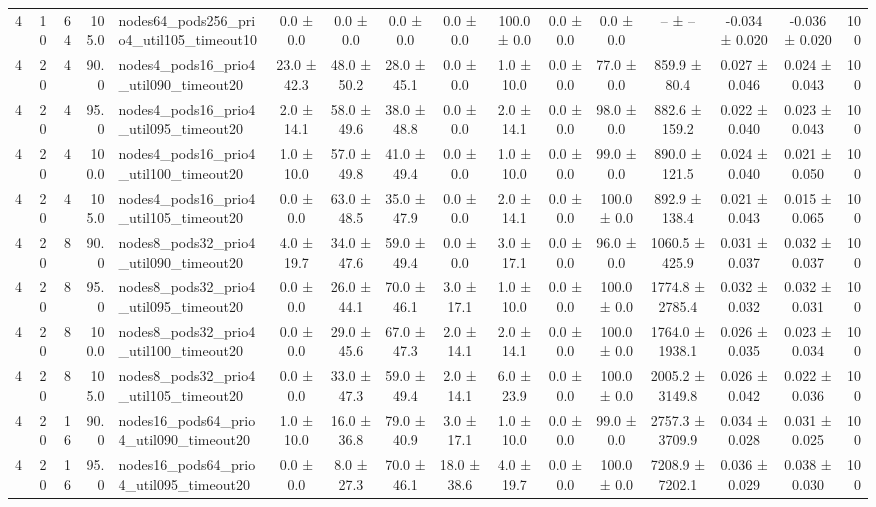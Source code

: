 \begin{tabular}{r r r r l c c c c c c c c c c r}
4 & 10 & 64 & 105.0 & nodes64\_pods256\_prio4\_util105\_timeout10 & 0.0 ± 0.0 & 0.0 ± 0.0 & 0.0 ± 0.0 & 0.0 ± 0.0 & 100.0 ± 0.0 & 0.0 ± 0.0 & 0.0 ± 0.0 & -- ± -- & -0.034 ± 0.020 & -0.036 ± 0.020 & 100 \\
4 & 20 & 4 & 90.0 & nodes4\_pods16\_prio4\_util090\_timeout20 & 23.0 ± 42.3 & 48.0 ± 50.2 & 28.0 ± 45.1 & 0.0 ± 0.0 & 1.0 ± 10.0 & 0.0 ± 0.0 & 77.0 ± 0.0 & 859.9 ± 80.4 & 0.027 ± 0.046 & 0.024 ± 0.043 & 100 \\
4 & 20 & 4 & 95.0 & nodes4\_pods16\_prio4\_util095\_timeout20 & 2.0 ± 14.1 & 58.0 ± 49.6 & 38.0 ± 48.8 & 0.0 ± 0.0 & 2.0 ± 14.1 & 0.0 ± 0.0 & 98.0 ± 0.0 & 882.6 ± 159.2 & 0.022 ± 0.040 & 0.023 ± 0.043 & 100 \\
4 & 20 & 4 & 100.0 & nodes4\_pods16\_prio4\_util100\_timeout20 & 1.0 ± 10.0 & 57.0 ± 49.8 & 41.0 ± 49.4 & 0.0 ± 0.0 & 1.0 ± 10.0 & 0.0 ± 0.0 & 99.0 ± 0.0 & 890.0 ± 121.5 & 0.024 ± 0.040 & 0.021 ± 0.050 & 100 \\
4 & 20 & 4 & 105.0 & nodes4\_pods16\_prio4\_util105\_timeout20 & 0.0 ± 0.0 & 63.0 ± 48.5 & 35.0 ± 47.9 & 0.0 ± 0.0 & 2.0 ± 14.1 & 0.0 ± 0.0 & 100.0 ± 0.0 & 892.9 ± 138.4 & 0.021 ± 0.043 & 0.015 ± 0.065 & 100 \\
4 & 20 & 8 & 90.0 & nodes8\_pods32\_prio4\_util090\_timeout20 & 4.0 ± 19.7 & 34.0 ± 47.6 & 59.0 ± 49.4 & 0.0 ± 0.0 & 3.0 ± 17.1 & 0.0 ± 0.0 & 96.0 ± 0.0 & 1060.5 ± 425.9 & 0.031 ± 0.037 & 0.032 ± 0.037 & 100 \\
4 & 20 & 8 & 95.0 & nodes8\_pods32\_prio4\_util095\_timeout20 & 0.0 ± 0.0 & 26.0 ± 44.1 & 70.0 ± 46.1 & 3.0 ± 17.1 & 1.0 ± 10.0 & 0.0 ± 0.0 & 100.0 ± 0.0 & 1774.8 ± 2785.4 & 0.032 ± 0.032 & 0.032 ± 0.031 & 100 \\
4 & 20 & 8 & 100.0 & nodes8\_pods32\_prio4\_util100\_timeout20 & 0.0 ± 0.0 & 29.0 ± 45.6 & 67.0 ± 47.3 & 2.0 ± 14.1 & 2.0 ± 14.1 & 0.0 ± 0.0 & 100.0 ± 0.0 & 1764.0 ± 1938.1 & 0.026 ± 0.035 & 0.023 ± 0.034 & 100 \\
4 & 20 & 8 & 105.0 & nodes8\_pods32\_prio4\_util105\_timeout20 & 0.0 ± 0.0 & 33.0 ± 47.3 & 59.0 ± 49.4 & 2.0 ± 14.1 & 6.0 ± 23.9 & 0.0 ± 0.0 & 100.0 ± 0.0 & 2005.2 ± 3149.8 & 0.026 ± 0.042 & 0.022 ± 0.036 & 100 \\
4 & 20 & 16 & 90.0 & nodes16\_pods64\_prio4\_util090\_timeout20 & 1.0 ± 10.0 & 16.0 ± 36.8 & 79.0 ± 40.9 & 3.0 ± 17.1 & 1.0 ± 10.0 & 0.0 ± 0.0 & 99.0 ± 0.0 & 2757.3 ± 3709.9 & 0.034 ± 0.028 & 0.031 ± 0.025 & 100 \\
4 & 20 & 16 & 95.0 & nodes16\_pods64\_prio4\_util095\_timeout20 & 0.0 ± 0.0 & 8.0 ± 27.3 & 70.0 ± 46.1 & 18.0 ± 38.6 & 4.0 ± 19.7 & 0.0 ± 0.0 & 100.0 ± 0.0 & 7208.9 ± 7202.1 & 0.036 ± 0.029 & 0.038 ± 0.030 & 100 \\

\end{tabular}

